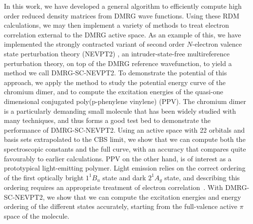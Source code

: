 In this work, we have developed a general algorithm to efficiently compute high order reduced density matrices from DMRG wave functions. 
Using these RDM calculations, we may then implement a variety of methods to treat electron correlation external to the DMRG active space.
As an example of this, we have implemented the strongly contracted variant of second order $N$-electron valence state perturbation theory (NEVPT2) 
\cite{angeli_introduction_2001,angeli_n-electron_2001, angeli_n-electron_2002}, an intruder-state-free multireference perturbation theory, on top
of the DMRG reference wavefunction, to yield a method we call DMRG-SC-NEVPT2.
To demonstrate the potential of this approach, we apply the method to study the potential energy curve of the chromium dimer, and 
to compute the excitation energies of the quasi-one dimensional conjugated poly(p-phenylene vinylene) (PPV). 
The chromium dimer is a particularly demanding small molecule that has been widely studied with many techniques\cite{roos_ground_2003,celani_cipt2_2004,angeli_third-order_2006,muller_large-scale_2009,kurashige_second-order_2011,ruiperez_complete_2011,kurashige_multireference_2014,sharma_multireference_2015}, and thus forms a good test bed to demonstrate the performance of DMRG-SC-NEVPT2. Using an active space with 22 orbitals and basis sets extrapolated to the CBS limit, we show that we can
compute both the spectroscopic constants and the full curve,
with an accuracy that compares quite favourably to earlier calculations.
PPV on the other hand, is of interest as a prototypical light-emitting polymer\cite{burroughes_light-emitting_1990,friend_electroluminescence_1999}.
Light emission relies
on the correct ordering of the first optically bright $1^{1}B_{u}$ state
and  dark $2^{1}A_{g}$ state, and describing this ordering requires an appropriate
treatment of electron correlation~\cite{beljonne_theoretical_1995,lavrentiev_theoretical_1999,shukla_correlated_2002, han_time-dependent_2004, saha_investigation_2007, bursill_symmetry-adapted_2009}.
With DMRG-SC-NEVPT2, we show that we can compute the excitation 
energies and energy ordering of the different states accurately, starting 
from the full-valence active $\pi$ space of the molecule.

